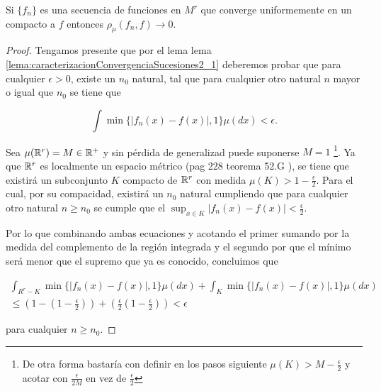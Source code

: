 \begin{lema}  
    Si $\{f_n\}$ es una secuencia de funciones en $M^r$ que converge
    uniformemente en un compacto a $f$ entonces $\rho_{\mu}(f_n, f) \longrightarrow 0$. 
\end{lema}  
\begin{proof}
    Tengamos presente que por el lema  lema \ref{lema:caracterizacionConvergenciaSucesiones2_1} 
    deberemos probar que para cualquier $\epsilon > 0$, 
    existe un $n_0$ natural, tal que para cualquier otro natural $n$ mayor o igual que $n_0$ se tiene que 

    \begin{equation}
        \int \min \{ |f_n(x) - f(x)|, 1\} \mu(dx) < \epsilon.
    \end{equation}  

    Sea $\mu(\mathbb{R}^r) = M \in \mathbb{R}^+$  y 
    sin pérdida de generalizad puede suponerse $M = 1$
     \footnote{De otra forma bastaría con definir 
    en los pasos siguiente $\mu(K) > M - \frac{\epsilon}{2}$ y acotar con $\frac{\epsilon}{2M}$ 
    en vez de $\frac{\epsilon}{2}$}. 
    Ya que $\mathbb{R}^r$ es localmente un espacio métrico 
    (pag 228 teorema 52.G \cite{nla.cat-vn1819421}),
    se tiene que existirá un subconjunto $K$ compacto de $\mathbb{R}^r$ con medida $\mu(K) > 1 - \frac{\epsilon}{2}.$
    Para el cual, por su compacidad, existirá un  $n_0$ natural cumpliendo que para cualquier otro 
    natural $n \geq n_0$ se cumple que el $\sup_{x \in K} |f_n(x) - f(x)| < \frac{\epsilon}{2}.$  

    Por lo que combinando ambas ecuaciones y acotando el primer sumando por la medida 
    del complemento de la región integrada y el segundo por que el mínimo será menor que el 
    supremo que ya es conocido, concluimos que 

    \begin{equation}
        \begin{split}
            \int_{R^r - K} \min \{ |f_n(x) - f(x)|, 1\} \mu(dx) +
            \int_{K} \min \{ |f_n(x) - f(x)|, 1\} \mu(dx)  \\ \leq
            \left( 1 - \left(1 -\frac{\epsilon}{2}\right)\right) + 
            \left(\frac{\epsilon}{2} \left( 1 -\frac{\epsilon}{2} \right)\right) < \epsilon
        \end{split}
    \end{equation}

    para cualquier $n \geq n_0$. 
\end{proof}


